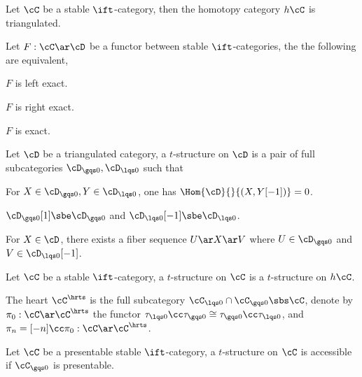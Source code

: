 \documentclass[article, a4paper, twoside]{universal}
\begin{document}
\begin{thm}[1.1.2.14]

    Let $\cC$ be a stable $\ift$-category, then the homotopy category $h\cC$ is triangulated.

\end{thm}

\begin{thm}[1.1.4.1]
    Let $F:\cC\ar\cD$ be a functor between stable $\ift$-categories, the the following are equivalent,
    \begin{enr}[label=(\arabic*)]
        \item $F$ is left exact.
        \item $F$ is right exact.
        \item $F$ is exact.
    \end{enr}
\end{thm}


\begin{dfn}[1.2.1.1]
    Let $\cD$ be a triangulated category, a $t$-structure on $\cD$ is a pair of full subcategories $\cD_{\gqs0},\cD_{\lqs0}$ such that
    \begin{enr}[label=(\arabic*)]
        \item For $X\in\cD_{\gqs0}, Y\in\cD_{\lqs0}$, one has $\Hom{\cD}{}{(X,Y[-1])}=0$.
        \item $\cD_{\gqs0}[1]\sbe\cD_{\gqs0}$ and $\cD_{\lqs0}[-1]\sbe\cD_{\lqs0}$.
        \item For $X\in\cD$, there exists a fiber sequence $U\ar X\ar V$ where $U\in\cD_{\gqs0}$ and $V\in\cD_{\lqs0}[-1]$.
    \end{enr}
\end{dfn}


\begin{dfn}[1.2.1.4, 1.2.1.11]
    Let $\cC$ be a stable $\ift$-category, a $t$-structure on $\cC$ is a $t$-structure on $h\cC$.

    The heart $\cC^{\hrts}$ is the full subcategory $\cC_{\lqs0}\cap\cC_{\gqs0}\sbs\cC$, denote by $\pi_{0}:\cC\ar\cC^{\hrts}$ the functor $\tau_{\lqs0}\cc\tau_{\gqs0}\cong\tau_{\gqs0}\cc\tau_{\lqs0}$, and $\pi_{n}=[-n]\cc\pi_{0}:\cC\ar\cC^{\hrts}$.
\end{dfn}


\begin{thm}[1.4.4.12]
    Let $\cC$ be a presentable stable $\ift$-category, a $t$-structure on $\cC$ is accessible if $\cC_{\gqs0}$ is presentable.

\end{thm}
\end{document}
